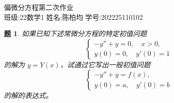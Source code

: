 \documentclass[12pt,a4paper]{article}
\newtheorem{problem}{题}
\begin{document}
	\begin{center}
		\LARGE 偏微分方程第二次作业 \\
		\vspace{0.5cm}
		\large 班级:22数学1 \quad 姓名:陈柏均 \quad 学号:202225110102
	\end{center}
	
	
	\begin{problem}
	
如果已知下述常微分方程的特定初值问题
	\begin{equation}\label{eq:1}
	\begin{cases}
		-y'' + y = 0,\quad  x > 0, \\
		y(0) = 0,\quad  y'(0) = 1
	\end{cases}
\end{equation}
	的解为 \( y = Y(x) \)，试通过它写出一般初值问题
	\begin{equation}\label{eq:2}
	\begin{cases}
		-y'' + y = f(x), \\
		y(0) = a,\quad  y'(0) = b
	\end{cases}
\end{equation}
	的解的表达式。
	
	\end{problem}
	
\end{document}
